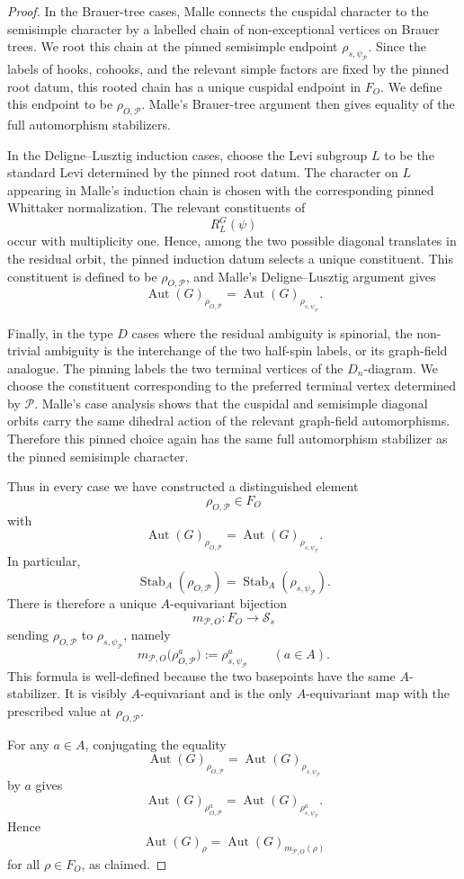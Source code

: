 \documentclass{amsart}
\theoremstyle{plain}
\numberwithin{equation}{section}
\theoremstyle{definition}
\newcommand{\cP}{\mathcal{P}}
\newcommand{\Stab}{\operatorname{Stab}}
\newcommand{\Aut}{\operatorname{Aut}}
\begin{document}
\begin{proof}
In the Brauer-tree cases, Malle connects the cuspidal character to the
semisimple character by a labelled chain of non-exceptional vertices on
Brauer trees.  We root this chain at the pinned semisimple endpoint
\(\rho_{s,\psi_{\cP}}\).  Since the labels of hooks, cohooks, and the relevant
simple factors are fixed by the pinned root datum, this rooted chain has a
unique cuspidal endpoint in \(F_O\).  We define this endpoint to be
\(\rho_{O,\cP}\).  Malle's Brauer-tree argument then gives equality of the
full automorphism stabilizers.

In the Deligne--Lusztig induction cases, choose the Levi subgroup \(L\) to be
the standard Levi determined by the pinned root datum.  The character on \(L\)
appearing in Malle's induction chain is chosen with the corresponding pinned
Whittaker normalization.  The relevant constituents of
\[
        R_L^G(\psi)
\]
occur with multiplicity one.  Hence, among the two possible diagonal translates
in the residual orbit, the pinned induction datum selects a unique constituent.
This constituent is defined to be \(\rho_{O,\cP}\), and Malle's
Deligne--Lusztig argument gives
\[
        \Aut(G)_{\rho_{O,\cP}}
        =
        \Aut(G)_{\rho_{s,\psi_{\cP}}}.
\]

Finally, in the type \(D\) cases where the residual ambiguity is spinorial, the
non-trivial ambiguity is the interchange of the two half-spin labels, or its
graph-field analogue.  The pinning labels the two terminal vertices of the
\(D_n\)-diagram.  We choose the constituent corresponding to the preferred
terminal vertex determined by \(\cP\).  Malle's case analysis shows that the
cuspidal and semisimple diagonal orbits carry the same dihedral action of the
relevant graph-field automorphisms.  Therefore this pinned choice again has
the same full automorphism stabilizer as the pinned semisimple character.

Thus in every case we have constructed a distinguished element
\[
        \rho_{O,\cP}\in F_O
\]
with
\[
        \Aut(G)_{\rho_{O,\cP}}
        =
        \Aut(G)_{\rho_{s,\psi_{\cP}}}.
\]
In particular,
\[
        \Stab_A(\rho_{O,\cP})
        =
        \Stab_A(\rho_{s,\psi_{\cP}}).
\]
There is therefore a unique \(A\)-equivariant bijection
\[
        m_{\cP,O}:F_O\longrightarrow \mathcal S_s
\]
sending \(\rho_{O,\cP}\) to \(\rho_{s,\psi_{\cP}}\), namely
\[
        m_{\cP,O}\bigl(\rho_{O,\cP}^a\bigr)
        :=
        \rho_{s,\psi_{\cP}}^a
        \qquad(a\in A).
\]
This formula is well-defined because the two basepoints have the same
\(A\)-stabilizer.  It is visibly \(A\)-equivariant and is the only
\(A\)-equivariant map with the prescribed value at \(\rho_{O,\cP}\).

For any \(a\in A\), conjugating the equality
\[
        \Aut(G)_{\rho_{O,\cP}}
        =
        \Aut(G)_{\rho_{s,\psi_{\cP}}}
\]
by \(a\) gives
\[
        \Aut(G)_{\rho_{O,\cP}^a}
        =
        \Aut(G)_{\rho_{s,\psi_{\cP}}^a}.
\]
Hence
\[
        \Aut(G)_\rho
        =
        \Aut(G)_{m_{\cP,O}(\rho)}
\]
for all \(\rho\in F_O\), as claimed.
\end{proof}
\end{document}
